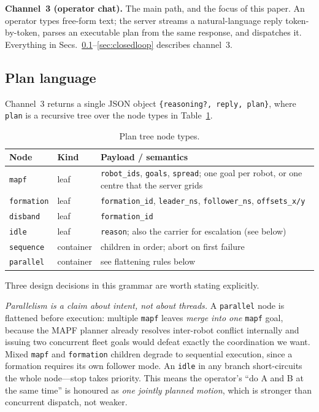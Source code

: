 \documentclass[10pt,twocolumn]{article}
\newcommand{\code}[1]{\texttt{\small #1}}
\begin{document}
\textbf{Channel~3 (operator chat).} The main path, and the focus of this paper.
An operator types free-form text; the server streams a natural-language reply
token-by-token, parses an executable plan from the same response, and dispatches
it. Everything in Secs.~\ref{sec:planlang}--\ref{sec:closedloop} describes
channel~3.

\subsection{Plan language}
\label{sec:planlang}

Channel~3 returns a single JSON object \code{\{reasoning?, reply, plan\}}, where
\code{plan} is a recursive tree over the node types in
Table~\ref{tab:planlang}.

\begin{table}[t]
\centering\small
\caption{Plan tree node types.}
\label{tab:planlang}
\begin{tabular}{@{}llp{4.1cm}@{}}
\toprule
\textbf{Node} & \textbf{Kind} & \textbf{Payload / semantics} \\
\midrule
\code{mapf}      & leaf & \code{robot\_ids}, \code{goals}, \code{spread}; one goal per robot, or one centre that the server grids \\
\code{formation} & leaf & \code{formation\_id}, \code{leader\_ns}, \code{follower\_ns}, \code{offsets\_x/y} \\
\code{disband}   & leaf & \code{formation\_id} \\
\code{idle}      & leaf & \code{reason}; also the carrier for escalation (see below) \\
\code{sequence}  & container & children in order; abort on first failure \\
\code{parallel}  & container & see flattening rules below \\
\bottomrule
\end{tabular}
\end{table}

Three design decisions in this grammar are worth stating explicitly.

\emph{Parallelism is a claim about intent, not about threads.} A
\code{parallel} node is flattened before execution: multiple \code{mapf} leaves
\emph{merge into one} \code{mapf} goal, because the MAPF planner already
resolves inter-robot conflict internally and issuing two concurrent fleet goals
would defeat exactly the coordination we want. Mixed \code{mapf} and
\code{formation} children degrade to sequential execution, since a formation
requires its own follower mode. An \code{idle} in any branch short-circuits the
whole node---stop takes priority. This means the operator's ``do A and B at the
same time'' is honoured as \emph{one jointly planned motion}, which is stronger
than concurrent dispatch, not weaker.
\end{document}
